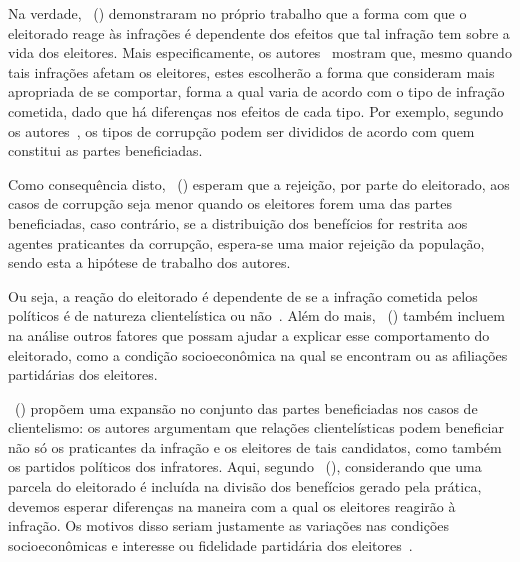 \documentclass[
	12pt,				%
	openright,			%
	twoside,			%
	a4paper,			%
	openany,
	english,			%
	brazil				%
	]{abntex2}
\begin{document}
Na verdade, ~(\citeyear{Botero2021Apr}) demonstraram no próprio trabalho que a forma com que o eleitorado reage às infrações é dependente dos efeitos que tal infração tem sobre a vida dos eleitores. Mais especificamente, os autores~\cite{Botero2021Apr} mostram que, mesmo quando tais infrações afetam os eleitores, estes escolherão a forma que consideram mais apropriada de se comportar, forma a qual varia de acordo com o tipo de infração cometida, dado que há diferenças nos efeitos de cada tipo. Por exemplo, segundo os autores~\cite{Botero2021Apr}, os tipos de corrupção podem ser divididos de acordo com quem constitui as partes beneficiadas.

Como consequência disto, ~(\citeyear{Botero2021Apr}) esperam que a rejeição, por parte do eleitorado, aos casos de corrupção seja menor quando os eleitores forem uma das partes beneficiadas, caso contrário, se a distribuição dos benefícios for restrita aos agentes praticantes da corrupção, espera-se uma maior rejeição da população, sendo esta a hipótese de trabalho dos autores.

Ou seja, a reação do eleitorado é dependente de se a infração cometida pelos políticos é de natureza clientelística ou não~\cite{Botero2021Apr}. Além do mais, ~(\citeyear{Botero2021Apr}) também incluem na análise outros fatores que possam ajudar a explicar esse comportamento do eleitorado, como a condição socioeconômica na qual se encontram ou as afiliações partidárias dos eleitores.


~(\citeyear{Botero2021Apr}) propõem uma expansão no conjunto das partes beneficiadas nos casos de clientelismo: os autores argumentam que relações clientelísticas podem beneficiar não só os praticantes da infração e os eleitores de tais candidatos, como também os partidos políticos dos infratores. Aqui, segundo ~(\citeyear{Botero2021Apr}), considerando que uma parcela do eleitorado é incluída na divisão dos benefícios gerado pela prática, devemos esperar diferenças na maneira com a qual os eleitores reagirão à infração. Os motivos disso seriam justamente as variações nas condições socioeconômicas e interesse ou fidelidade partidária dos eleitores~\cite{Botero2021Apr}.
\end{document}
